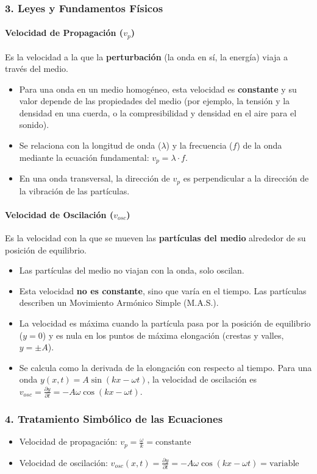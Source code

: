 \subsubsection*{3. Leyes y Fundamentos Físicos}
\paragraph*{Velocidad de Propagación ($v_p$)}
Es la velocidad a la que la \textbf{perturbación} (la onda en sí, la energía) viaja a través del medio.
\begin{itemize}
    \item Para una onda en un medio homogéneo, esta velocidad es \textbf{constante} y su valor depende de las propiedades del medio (por ejemplo, la tensión y la densidad en una cuerda, o la compresibilidad y densidad en el aire para el sonido).
    \item Se relaciona con la longitud de onda ($\lambda$) y la frecuencia ($f$) de la onda mediante la ecuación fundamental: $v_p = \lambda \cdot f$.
    \item En una onda transversal, la dirección de $v_p$ es perpendicular a la dirección de la vibración de las partículas.
\end{itemize}

\paragraph*{Velocidad de Oscilación ($v_{osc}$)}
Es la velocidad con la que se mueven las \textbf{partículas del medio} alrededor de su posición de equilibrio.
\begin{itemize}
    \item Las partículas del medio no viajan con la onda, solo oscilan.
    \item Esta velocidad \textbf{no es constante}, sino que varía en el tiempo. Las partículas describen un Movimiento Armónico Simple (M.A.S.).
    \item La velocidad es máxima cuando la partícula pasa por la posición de equilibrio ($y=0$) y es nula en los puntos de máxima elongación (crestas y valles, $y=\pm A$).
    \item Se calcula como la derivada de la elongación con respecto al tiempo. Para una onda $y(x,t) = A\sin(kx - \omega t)$, la velocidad de oscilación es $v_{osc} = \frac{\partial y}{\partial t} = -A\omega\cos(kx - \omega t)$.
\end{itemize}

\subsubsection*{4. Tratamiento Simbólico de las Ecuaciones}
\begin{itemize}
    \item Velocidad de propagación: $v_p = \frac{\omega}{k} = \text{constante}$
    \item Velocidad de oscilación: $v_{osc}(x,t) = \frac{\partial y}{\partial t} = -A\omega\cos(kx - \omega t) = \text{variable}$
\end{itemize}

